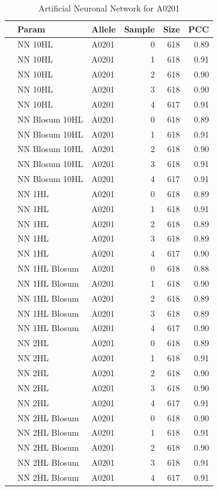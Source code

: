 \begin{table}[ht]
\begin{center}
\begin{tabular}{rllrrr}
  \hline
 & Param & Allele & Sample & Size & PCC \\ 
  \hline
 & NN 10HL & A0201 &   0 & 618 & 0.89 \\ 
   & NN 10HL & A0201 &   1 & 618 & 0.91 \\ 
   & NN 10HL & A0201 &   2 & 618 & 0.90 \\ 
   & NN 10HL & A0201 &   3 & 618 & 0.90 \\ 
   & NN 10HL & A0201 &   4 & 617 & 0.91 \\ 
   \hline
   & NN Blosum 10HL & A0201 &   0 & 618 & 0.89 \\ 
   & NN Blosum 10HL & A0201 &   1 & 618 & 0.91 \\ 
   & NN Blosum 10HL & A0201 &   2 & 618 & 0.90 \\ 
   & NN Blosum 10HL & A0201 &   3 & 618 & 0.91 \\ 
   & NN Blosum 10HL & A0201 &   4 & 617 & 0.91 \\ 
   \hline
   & NN 1HL & A0201 &   0 & 618 & 0.89 \\ 
   & NN 1HL & A0201 &   1 & 618 & 0.91 \\ 
   & NN 1HL & A0201 &   2 & 618 & 0.89 \\ 
   & NN 1HL & A0201 &   3 & 618 & 0.89 \\ 
   & NN 1HL & A0201 &   4 & 617 & 0.90 \\ 
   \hline
   & NN 1HL Blosum & A0201 &   0 & 618 & 0.88 \\ 
   & NN 1HL Blosum & A0201 &   1 & 618 & 0.90 \\ 
   & NN 1HL Blosum & A0201 &   2 & 618 & 0.89 \\ 
   & NN 1HL Blosum & A0201 &   3 & 618 & 0.89 \\ 
   & NN 1HL Blosum & A0201 &   4 & 617 & 0.90 \\ 
   \hline
   & NN 2HL & A0201 &   0 & 618 & 0.89 \\ 
   & NN 2HL & A0201 &   1 & 618 & 0.91 \\ 
   & NN 2HL & A0201 &   2 & 618 & 0.90 \\ 
   & NN 2HL & A0201 &   3 & 618 & 0.90 \\ 
   & NN 2HL & A0201 &   4 & 617 & 0.91 \\ 
   \hline
   & NN 2HL Blosum & A0201 &   0 & 618 & 0.90 \\ 
   & NN 2HL Blosum & A0201 &   1 & 618 & 0.91 \\ 
   & NN 2HL Blosum & A0201 &   2 & 618 & 0.90 \\ 
   & NN 2HL Blosum & A0201 &   3 & 618 & 0.91 \\ 
   & NN 2HL Blosum & A0201 &   4 & 617 & 0.91 \\ 
   \hline
\end{tabular}
\label{tab:nn1}
\caption{Artificial Neuronal Network for A0201}
\end{center}
\end{table}



